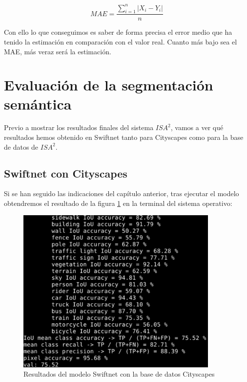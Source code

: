 \begin{equation}\label{eq:mae}
MAE = \frac{\sum_{i=1}^{n}|X_i - Y_i|}{n}
\end{equation}

Con ello lo que conseguimos es saber de forma precisa el error medio que ha tenido la estimación en comparación con el valor real. Cuanto más bajo sea el \ac{MAE}, más veraz será la estimación.
\section{Evaluación de la segmentación semántica}

Previo a mostrar los resultados finales del sistema $ISA^{2}$, vamos a ver qué resultados hemos obtenido en Swiftnet tanto para Cityscapes como para la base de datos de $ISA^{2}$.

\subsection{Swiftnet con Cityscapes}

Si se han seguido las indicaciones del capítulo anterior, tras ejecutar el modelo obtendremos el resultado de la figura \ref{fig:Res_Swift} en la terminal del sistema operativo:

\begin{figure}[H]
\centering
\includegraphics[width=10cm]{Figuras/Res_Swiftnet_Cityscapes.eps}
\caption{Resultados del modelo Swiftnet con la base de datos Cityscapes}
\label{fig:Res_Swift}
\end{figure}

